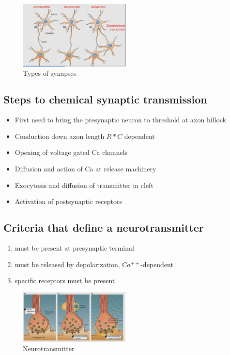 \documentclass{article}
\begin{document}
\begin{figure}[h]
\centering
\includegraphics[width=0.5\textwidth]{assets/types-of-synapses.png}
\caption{Types of synapses}
\end{figure}

\subsection*{Steps to chemical synaptic transmission}

\begin{itemize}
    \item First need to bring the presynaptic neuron to threshold at axon hillock
    \item Conduction down axon length $R * C$ dependent
    \item Opening of voltage gated Ca channels
    \item Diffusion and action of Ca at release machinery
    \item Exocytosis and diffusion of transmitter in cleft
    \item Activation of postsynaptic receptors
\end{itemize}

\subsection*{Criteria that define a neurotransmitter}

\begin{enumerate}
    \item must be present at presynaptic terminal
    \item must be released by depolarization, $Ca^{++}$-dependent
    \item specific receptors must be present
\end{enumerate}

\begin{figure}[h]
\centering
\includegraphics[width=0.5\textwidth]{assets/neurotransmitter.png}
\caption{Neurotransmitter}
\end{figure}
\end{document}
